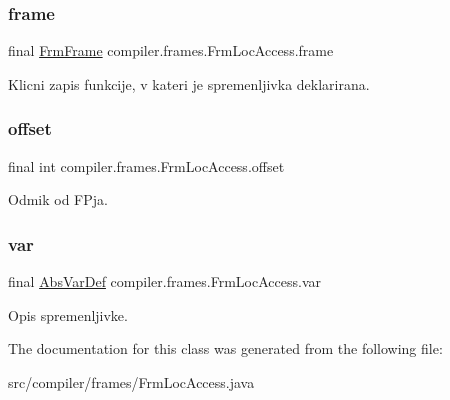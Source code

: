 \subsubsection{\texorpdfstring{frame}{frame}}
{\footnotesize\ttfamily final \hyperlink{classcompiler_1_1frames_1_1_frm_frame}{Frm\+Frame} compiler.\+frames.\+Frm\+Loc\+Access.\+frame}

Klicni zapis funkcije, v kateri je spremenljivka deklarirana. \mbox{\label{classcompiler_1_1frames_1_1_frm_loc_access_a5bd0d3cfeda051f31fb6b0dca4c0577d}} 
\subsubsection{\texorpdfstring{offset}{offset}}
{\footnotesize\ttfamily final int compiler.\+frames.\+Frm\+Loc\+Access.\+offset}

Odmik od F\+Pja. \mbox{\label{classcompiler_1_1frames_1_1_frm_loc_access_a93b5f9ae202e1635fbbafc901fe8a2d3}} 
\subsubsection{\texorpdfstring{var}{var}}
{\footnotesize\ttfamily final \hyperlink{classcompiler_1_1abstr_1_1tree_1_1def_1_1_abs_var_def}{Abs\+Var\+Def} compiler.\+frames.\+Frm\+Loc\+Access.\+var}

Opis spremenljivke. 

The documentation for this class was generated from the following file\+:\begin{DoxyCompactItemize}
\item 
src/compiler/frames/Frm\+Loc\+Access.\+java\end{DoxyCompactItemize}
